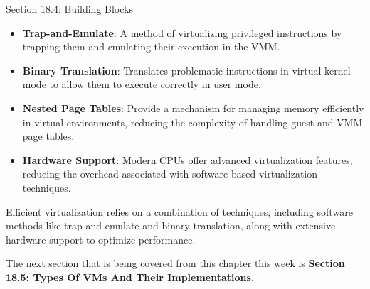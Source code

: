 \begin{notes}{Section 18.4: Building Blocks}
\begin{highlight}
    \end{highlight}
    
    \begin{highlight}
    
        \begin{itemize}
            \item \textbf{Trap-and-Emulate}: A method of virtualizing privileged instructions by trapping them and emulating their execution in the VMM.
            \item \textbf{Binary Translation}: Translates problematic instructions in virtual kernel mode to allow them to execute correctly in user mode.
            \item \textbf{Nested Page Tables}: Provide a mechanism for managing memory efficiently in virtual environments, reducing the complexity of handling guest and VMM page tables.
            \item \textbf{Hardware Support}: Modern CPUs offer advanced virtualization features, reducing the overhead associated with software-based virtualization techniques.
        \end{itemize}
    
    Efficient virtualization relies on a combination of techniques, including software methods like trap-and-emulate and binary translation, along with extensive hardware support to optimize performance.
    
    \end{highlight}
\end{notes}

The next section that is being covered from this chapter this week is \textbf{Section 18.5: Types Of VMs And Their Implementations}.

